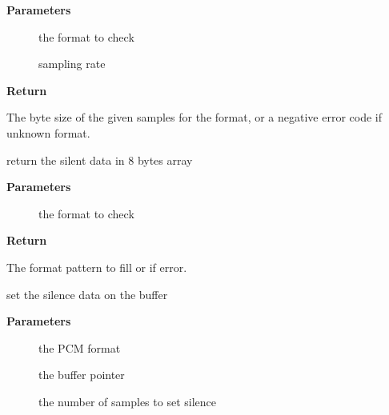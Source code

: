 \documentclass[a4paper,8pt,english]{sphinxmanual}
\begin{document}
\textbf{Parameters}
\begin{description}
\item[{}] \leavevmode
the format to check

\item[{}] \leavevmode
sampling rate

\end{description}

\textbf{Return}

The byte size of the given samples for the format, or a
negative error code if unknown format.

\begin{fulllineitems}
\label{sound/kernel-api/alsa-driver-api:c.snd_pcm_format_silence_64}
return the silent data in 8 bytes array

\end{fulllineitems}


\textbf{Parameters}
\begin{description}
\item[{}] \leavevmode
the format to check

\end{description}

\textbf{Return}

The format pattern to fill or  if error.

\begin{fulllineitems}
\label{sound/kernel-api/alsa-driver-api:c.snd_pcm_format_set_silence}
set the silence data on the buffer

\end{fulllineitems}


\textbf{Parameters}
\begin{description}
\item[{}] \leavevmode
the PCM format

\item[{}] \leavevmode
the buffer pointer

\item[{}] \leavevmode
the number of samples to set silence

\end{description}
\end{document}
